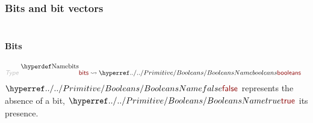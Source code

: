 \subsubsection*{Bits and bit vectors}\hypertarget{bits-and-bit-vectors}{}\label{bits-and-bit-vectors}

\begin{align*}
  [ ~ 
  \KEY{Type} ~ & \NAMEREF{bits} \\
  \KEY{Datatype} ~ & \NAMEREF{bit-vectors} \\
  \KEY{Funcon} ~ & \NAMEREF{bit-vector} \\
  \KEY{Type} ~ & \NAMEREF{bytes} \\
  \KEY{Alias} ~ & \NAMEREF{octets} \\
  \KEY{Funcon} ~ & \NAMEREF{bit-vector-not} \\
  \KEY{Funcon} ~ & \NAMEREF{bit-vector-and} \\
  \KEY{Funcon} ~ & \NAMEREF{bit-vector-or} \\
  \KEY{Funcon} ~ & \NAMEREF{bit-vector-xor} \\
  \KEY{Funcon} ~ & \NAMEREF{bit-vector-shift-left} \\
  \KEY{Funcon} ~ & \NAMEREF{bit-vector-logical-shift-right} \\
  \KEY{Funcon} ~ & \NAMEREF{bit-vector-arithmetic-shift-right} \\
  \KEY{Funcon} ~ & \NAMEREF{integer-to-bit-vector} \\
  \KEY{Funcon} ~ & \NAMEREF{bit-vector-to-integer} \\
  \KEY{Funcon} ~ & \NAMEREF{bit-vector-to-natural} \\
  \KEY{Funcon} ~ & \NAMEREF{unsigned-bit-vector-maximum} \\
  \KEY{Funcon} ~ & \NAMEREF{signed-bit-vector-maximum} \\
  \KEY{Funcon} ~ & \NAMEREF{signed-bit-vector-minimum} \\
  \KEY{Funcon} ~ & \NAMEREF{is-in-signed-bit-vector} \\
  \KEY{Funcon} ~ & \NAMEREF{is-in-unsigned-bit-vector}
  ~ ]
\end{align*}
\paragraph*{Bits}\hypertarget{bits}{}\label{bits}

\begin{align*}
  \KEY{Type} ~  
  & \NAMEDECL{bits}  
  \leadsto \NAMEHYPER{../../Primitive}{Booleans}{booleans}
\end{align*}
$\SHADE{\NAMEHYPER{../../Primitive}{Booleans}{false}}$ represents the absence of a bit, $\SHADE{\NAMEHYPER{../../Primitive}{Booleans}{true}}$ its presence.

